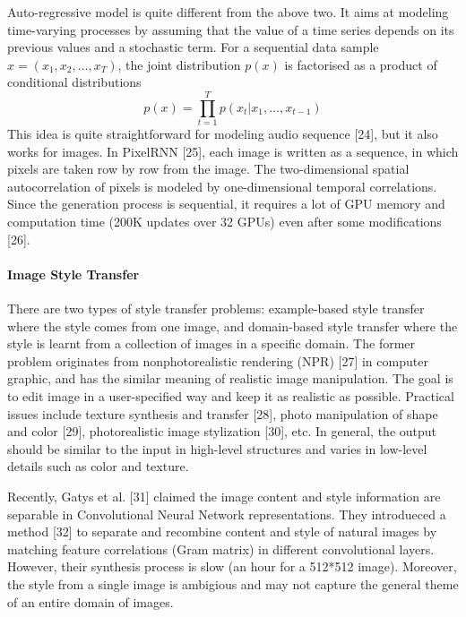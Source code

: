\documentclass{article}
\begin{document}
Auto-regressive model is quite different from the above two. It aims at modeling time-varying processes by assuming that the value of a time series depends on its previous values and a stochastic term. For a sequential data sample $x = (x_1, x_2, \ldots, x_T)$, the joint distribution $p(x)$ is factorised as a product of conditional distributions
\begin{equation}
p(x) = \prod_{t=1}^{T} p(x_t|x_1, \ldots, x_{t-1})
\end{equation}
This idea is quite straightforward for modeling audio sequence [24], but it also works for images. In PixelRNN [25], each image is written as a sequence, in which pixels are taken row by row from the image. The two-dimensional spatial autocorrelation of pixels is modeled by one-dimensional temporal correlations. Since the generation process is sequential, it requires a lot of GPU memory and computation time (200K updates over 32 GPUs) even after some modifications [26].


\paragraph{Image Style Transfer} %
There are two types of style transfer problems: example-based style transfer where the style comes from one image, and domain-based style transfer where the style is learnt from a collection of images in a specific domain. The former problem originates from nonphotorealistic rendering (NPR) [27] in computer graphic, and has the similar meaning of realistic image manipulation. The goal is to edit image in a user-specified way and keep it as realistic as possible. Practical issues include texture synthesis and transfer [28], photo manipulation of shape and color [29], photorealistic image stylization [30], etc. In general, the output should be similar to the input in high-level structures and varies in low-level details such as color and texture.

Recently, Gatys et al. [31] claimed the image content and style information are separable in Convolutional Neural Network representations. They introdueced a method [32] to separate and recombine content and style of natural images by matching feature correlations (Gram matrix) in different convolutional layers. However, their synthesis process is slow (an hour for a 512*512 image). Moreover, the style from a single image is ambigious and may not capture the general theme of an entire domain of images.
\end{document}
